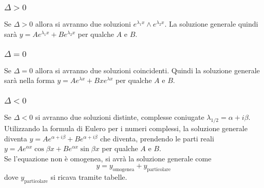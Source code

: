\subsubsection{$\Delta > 0$}
Se $\Delta>0$ allora si avranno due soluzioni $e^{\lambda_1 x}\land e^{\lambda_2 x}$. La soluzione
generale quindi sarà $y=Ae^{\lambda_1 x}+Be^{\lambda_2 x}$ per qualche $A$ e $B$.
\subsubsection{$\Delta = 0$}
Se $\Delta=0$ allora si avranno due soluzioni coincidenti. Quindi la soluzione generale sarà nella 
forma $y=Ae^{\lambda x}+Bxe^{\lambda x}$ per qualche $A$ e $B$.
\subsubsection{$\Delta<0$}
Se $\Delta<0$ si avranno due soluzioni distinte, complesse coniugate 
$\lambda_{1/2}=\alpha+ i\beta$. Utilizzando la formula di Eulero per i numeri complessi, la 
soluzione generale diventa $y=Ae^{\alpha+i\beta}+Be^{\alpha+i\beta}$ che diventa, prendendo le parti
reali $y=Ae^{\alpha x}\cos\beta x +Be^{\alpha x}\sin\beta x$ per qualche $A$ e $B$.\\ [\baselineskip]
Se l'equazione non è omogenea, si avrà la soluzione generale come
\begin{equation*}
  y = y_{\text{omogenea}}+y_{\text{particolare}}
\end{equation*}
dove $y_\text{particolare}$ si ricava tramite tabelle.
